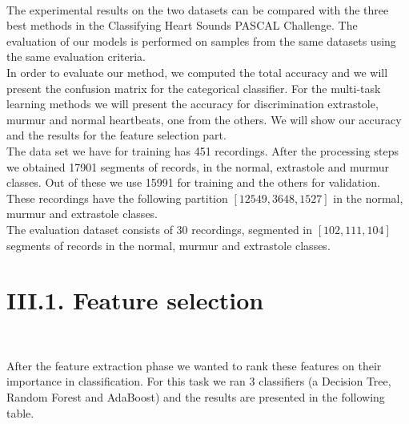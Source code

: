 \documentclass[11pt, a4papper]{report}
\theoremstyle{plain}
\theoremstyle{definition}
\theoremstyle{definition}
\theoremstyle{proposition}
\begin{document}
\

The experimental results on the two datasets can be compared with the three best methods in the Classifying Heart Sounds PASCAL Challenge. The evaluation of our models is performed on samples from the same datasets using the same evaluation criteria.
\\

In order to evaluate our method, we computed the total accuracy and we will present the confusion matrix for the categorical classifier. For the multi-task learning methods we will present the accuracy for discrimination extrastole, murmur and normal heartbeats, one from the others. We will show our accuracy and the results for the feature selection part.
\\

The data set we have for training has 451 recordings. After the processing steps we obtained 17901 segments of records, in the normal, extrastole and murmur classes. Out of these we use 15991 for training and the others for validation. These recordings have the following partition $[12549, 3648, 1527]$ in the normal, murmur and extrastole classes.
\\

The evaluation dataset consists of 30 recordings, segmented in $[102, 111, 104]$ segments of records in the normal, murmur and extrastole classes.
\\

\section*{III.1. Feature selection}

\

After the feature extraction phase we wanted to rank these features on their importance in classification. For this task we ran 3 classifiers (a Decision Tree, Random Forest and AdaBoost) and the results are presented in the following table.
\\
\end{document}
